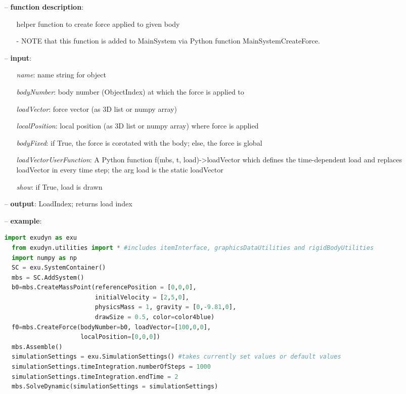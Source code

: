\begin{itemize}[leftmargin=0.7cm]
\item[--]
{\bf function description}: \vspace{-6pt}
\begin{itemize}[leftmargin=1.2cm]
\setlength{\itemindent}{-0.7cm}
\item[]helper function to create force applied to given body
\item[]- NOTE that this function is added to MainSystem via Python function MainSystemCreateForce.
\end{itemize}
\item[--]
{\bf input}: \vspace{-6pt}
\begin{itemize}[leftmargin=1.2cm]
\setlength{\itemindent}{-0.7cm}
\item[]{\it name}: name string for object
\item[]{\it bodyNumber}: body number (ObjectIndex) at which the force is applied to
\item[]{\it loadVector}: force vector (as 3D list or numpy array)
\item[]{\it localPosition}: local position (as 3D list or numpy array) where force is applied
\item[]{\it bodyFixed}: if True, the force is corotated with the body; else, the force is global
\item[]{\it loadVectorUserFunction}: A Python function f(mbs, t, load)->loadVector which defines the time-dependent load and replaces loadVector in every time step; the arg load is the static loadVector
\item[]{\it show}: if True, load is drawn
\end{itemize}
\item[--]
{\bf output}: LoadIndex; returns load index
\item[--]
{\bf example}: \vspace{-12pt}\ei\begin{lstlisting}[language=Python, xleftmargin=36pt]
  import exudyn as exu
  from exudyn.utilities import * #includes itemInterface, graphicsDataUtilities and rigidBodyUtilities
  import numpy as np
  SC = exu.SystemContainer()
  mbs = SC.AddSystem()
  b0=mbs.CreateMassPoint(referencePosition = [0,0,0],
                         initialVelocity = [2,5,0],
                         physicsMass = 1, gravity = [0,-9.81,0],
                         drawSize = 0.5, color=color4blue)
  f0=mbs.CreateForce(bodyNumber=b0, loadVector=[100,0,0],
                     localPosition=[0,0,0])
  mbs.Assemble()
  simulationSettings = exu.SimulationSettings() #takes currently set values or default values
  simulationSettings.timeIntegration.numberOfSteps = 1000
  simulationSettings.timeIntegration.endTime = 2
  mbs.SolveDynamic(simulationSettings = simulationSettings)
\end{lstlisting}\vspace{-24pt}\bi\item[]\vspace{-24pt}\vspace{12pt}\end{itemize}
%

